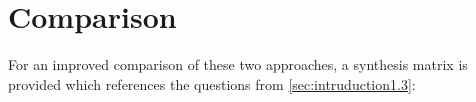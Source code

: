 \section{Comparison} \label{sec:9_comparison}

For an improved comparison of these two approaches, a synthesis matrix is provided which references the questions from \autoref{sec:intruduction1.3}:


